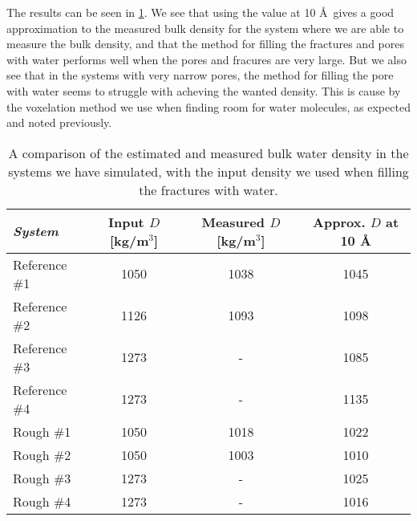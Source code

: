 The results can be seen in \cref{tab:estimate_bulk_density}. We see that using the value at 10 \AA\ gives a good approximation to the measured bulk density for the system where we are able to measure the bulk density, and that the method for filling the fractures and pores with water performs well when the pores and fracures are very large. But we also see that in the systems with very narrow pores, the method for filling the pore with water seems to struggle with acheving the wanted density. This is cause by the voxelation method we use when finding room for water molecules, as expected and noted previously.
%
\begin{table}[!htb]%
    \centering%
    \begin{tabular}{l|ccc}%
    \textit{System} & Input $D$ [kg/m$^3$]  & Measured $D$ [kg/m$^3$]   & Approx. $D$ at 10 \AA \\ \hline
    Reference \#1   & 1050                  & 1038                      & 1045 \\
    Reference \#2   & 1126                  & 1093                      & 1098 \\
    Reference \#3   & 1273                  & -                         & 1085 \\
    Reference \#4   & 1273                  & -                         & 1135 \\
    Rough \#1       & 1050                  & 1018                      & 1022 \\
    Rough \#2       & 1050                  & 1003                      & 1010 \\
    Rough \#3       & 1273                  & -                         & 1025 \\
    Rough \#4       & 1273                  & -                         & 1016 \\
    \end{tabular}%
    \vspace{8pt}%
    \caption{%
        A comparison of the estimated and measured bulk water density in the systems we have simulated, with the input density we used when filling the fractures with water.
        \label{tab:estimate_bulk_density}%
    }%
\end{table}%
